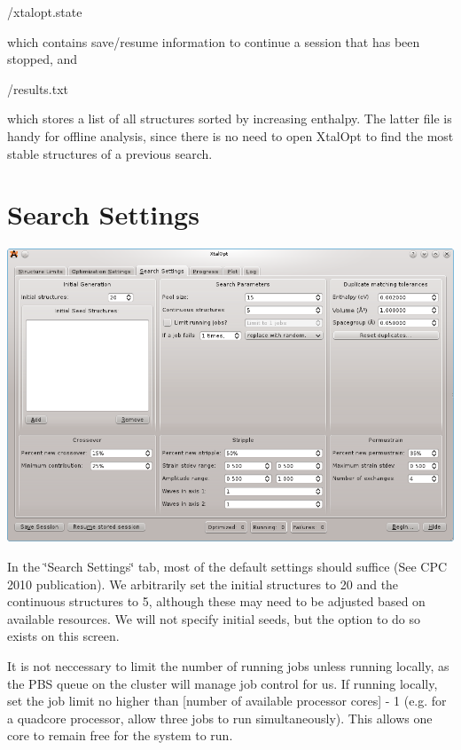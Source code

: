\begin{DoxyCode}
/xtalopt.state
\end{DoxyCode}


which contains save/resume information to continue a session that has been stopped, and


\begin{DoxyCode}
/results.txt
\end{DoxyCode}


which stores a list of all structures sorted by increasing enthalpy. The latter file is handy for offline analysis, since there is no need to open Xtal\+Opt to find the most stable structures of a previous search.\hypertarget{tut-xo_search-set}{}\section{Search Settings}\label{tut-xo_search-set}
 
\begin{DoxyImageNoCaption}
  \mbox{\includegraphics[width=\textwidth]{search-set.png}}
\end{DoxyImageNoCaption}


In the \char`\"{}\+Search Settings\char`\"{} tab, most of the default settings should suffice (See C\+P\+C 2010 publication). We arbitrarily set the initial structures to 20 and the continuous structures to 5, although these may need to be adjusted based on available resources. We will not specify initial seeds, but the option to do so exists on this screen.

It is not neccessary to limit the number of running jobs unless running locally, as the P\+B\+S queue on the cluster will manage job control for us. If running locally, set the job limit no higher than \mbox{[}number of available processor cores\mbox{]} -\/ 1 (e.\+g. for a quadcore processor, allow three jobs to run simultaneously). This allows one core to remain free for the system to run.

